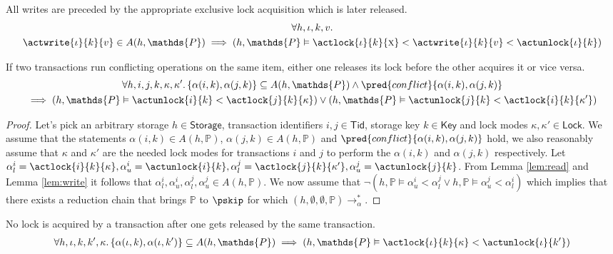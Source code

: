 \lem \label{lem:write} All writes are preceded by the appropriate exclusive lock acquisition which is later released.
\begin{gather*}
\forall h, \iota, k, v \ldotp \\
\actwrite{\iota}{k}{v} \in A(h, \mathds{P}) \implies \left( h, \mathds{P} \vDash \actlock{\iota}{k}{\textsc{x}} < \actwrite{\iota}{k}{v} < \actunlock{\iota}{k} \right)
\end{gather*}

\lem If two transactions run conflicting operations on the same item, either one releases its lock before the other acquires it or vice versa.
\begin{gather*}
\forall h, i, j, k, \kappa, \kappa' \ldotp 
\{ \alpha(i, k), \alpha(j, k) \} \subseteq A(h, \mathds{P}) \land \pred{conflict}{\alpha(i, k), \alpha(j, k)} 
\\
\implies \left( h, \mathds{P} \vDash \actunlock{i}{k} < \actlock{j}{k}{\kappa} \right) \lor \left( h, \mathds{P} \vDash \actunlock{j}{k} < \actlock{i}{k}{\kappa'} \right)
\end{gather*}

\begin{proof}
Let's pick an arbitrary storage $h \in \mathsf{Storage}$, transaction identifiers $i, j \in \mathsf{Tid}$, storage key $k \in \mathsf{Key}$ and lock modes $\kappa, \kappa' \in \mathsf{Lock}$. We assume that the statements $\alpha(i, k) \in A(h, \mathds{P})$, $\alpha(j, k) \in A(h, \mathds{P})$ and $\pred{conflict}{\alpha(i, k), \alpha(j, k)}$ hold, we also reasonably assume that $\kappa$ and $\kappa'$ are the needed lock modes for transactions $i$ and $j$ to perform the $\alpha(i, k)$ and $\alpha(j, k)$ respectively. Let $\alpha_l^i = \actlock{i}{k}{\kappa}, \alpha_u^i = \actunlock{i}{k}, \alpha_l^j = \actlock{j}{k}{\kappa'}, \alpha_u^j = \actunlock{j}{k}$. From Lemma \ref{lem:read} and Lemma \ref{lem:write} it follows that $\alpha_l^i, \alpha_u^i, \alpha_l^j, \alpha_u^j \in A(h, \mathds{P})$. We now assume that $\lnot \left( h, \mathds{P} \vDash \alpha_u^i < \alpha_l^j  \lor h, \mathds{P} \vDash \alpha_u^j < \alpha_l^i \right)$ which implies that there exists a reduction chain that brings $\mathds{P}$ to $\pskip$ for which $(h, \emptyset, \emptyset, \mathds{P}) \rightarrow^*_{\alpha}$.
\end{proof}

\lem No lock is acquired by a transaction after one gets released by the same transaction.
\begin{gather*}
\forall h, \iota, k, k', \kappa \ldotp 
\{ \alpha(\iota, k), \alpha(\iota, k') \} \subseteq A(h, \mathds{P})
\implies \left( h, \mathds{P} \vDash \actlock{\iota}{k}{\kappa} < \actunlock{\iota}{k'} \right)
\end{gather*}

